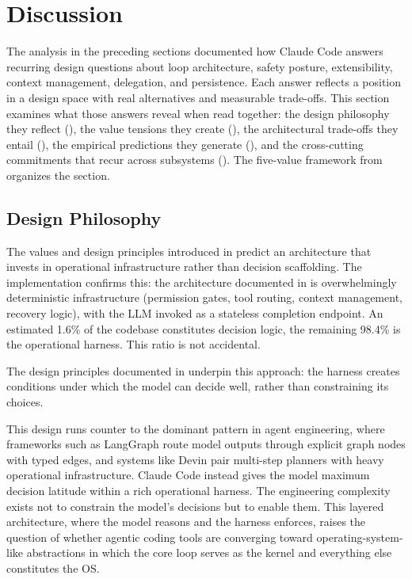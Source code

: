 \section{Discussion}
\label{sec:discuss}

The analysis in the preceding sections documented how Claude Code answers recurring design questions about loop architecture, safety posture, extensibility, context management, delegation, and persistence. Each answer reflects a position in a design space with real alternatives and measurable trade-offs. This section examines what those answers reveal when read together: the design philosophy they reflect (), the value tensions they create (), the architectural trade-offs they entail (), the empirical predictions they generate (), and the cross-cutting commitments that recur across subsystems (). The five-value framework from  organizes the section.

\subsection{Design Philosophy}
\label{sec:discuss:philosophy}

The values and design principles introduced in  predict an architecture that invests in operational infrastructure rather than decision scaffolding. The implementation confirms this: the architecture documented in  is overwhelmingly deterministic infrastructure (permission gates, tool routing, context management, recovery logic), with the LLM invoked as a stateless completion endpoint. An estimated 1.6\% of the codebase constitutes decision logic, the remaining 98.4\% is the operational harness. This ratio is not accidental.

The design principles documented in  underpin this approach: the harness creates conditions under which the model can decide well, rather than constraining its choices.

This design runs counter to the dominant pattern in agent engineering, where frameworks such as LangGraph route model outputs through explicit graph nodes with typed edges, and systems like Devin pair multi-step planners with heavy operational infrastructure. Claude Code instead gives the model maximum decision latitude within a rich operational harness. The engineering complexity exists not to constrain the model's decisions but to enable them. This layered architecture, where the model reasons and the harness enforces, raises the question of whether agentic coding tools are converging toward operating-system-like abstractions in which the core loop serves as the kernel and everything else constitutes the OS.

